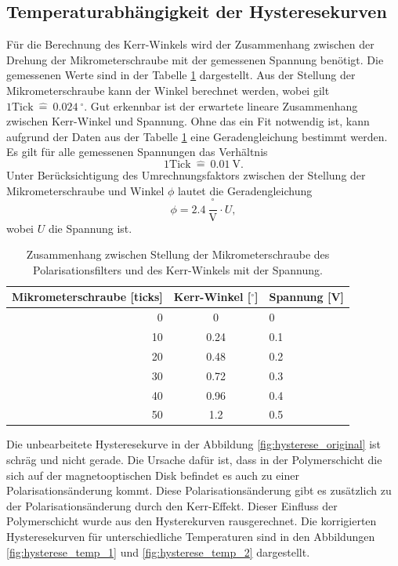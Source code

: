 \subsection{Temperaturabhängigkeit der Hysteresekurven}
Für die Berechnung des Kerr-Winkels wird der Zusammenhang zwischen der Drehung der Mikrometerschraube mit der gemessenen Spannung benötigt. Die gemessenen Werte sind in der Tabelle \ref{tab:Mikrometerschraube} dargestellt. Aus der Stellung der Mikrometerschraube kann der Winkel berechnet werden, wobei gilt $ 1 \mathrm{Tick}\ \widehat{=}\ 0.024\ {}^\circ$. Gut erkennbar ist der erwartete lineare Zusammenhang zwischen Kerr-Winkel und Spannung. Ohne das ein Fit notwendig ist, kann aufgrund der Daten aus der Tabelle \ref{tab:Mikrometerschraube} eine Geradengleichung bestimmt werden. Es gilt für alle gemessenen Spannungen das Verhältnis
\begin{equation}
1 \mathrm{Tick}\ \widehat{=}\ 0.01\ \mathrm{V}.
\end{equation}
Unter Berücksichtigung des Umrechnungsfaktors zwischen der Stellung der Mikrometerschraube und Winkel $\phi$ lautet die Geradengleichung 
\begin{equation}
\phi = 2.4\ \frac{{ }^\circ}{\mathrm{V}} \cdot U,
\label{eq:Kerr}
\end{equation}
wobei $U$ die Spannung ist. 

\begin{table}[h]
    \centering
    \caption{
        Zusammenhang zwischen Stellung der Mikrometerschraube des Polarisationsfilters und  des Kerr-Winkels mit der Spannung.
        }
    \label{tab:Mikrometerschraube}
    \begin{tabular}{r|c|l}
    Mikrometerschraube [ticks] & Kerr-Winkel [${}^\circ$]& Spannung [V] \\\hline
    0  & 0 & 0
 \\
    10 & 0.24 & 0.1
 \\
    20 & 0.48 & 0.2
 \\
    30 & 0.72 & 0.3
 \\
    40 & 0.96 & 0.4
 \\
    50 & 1.2 & 0.5 \\   
    \end{tabular}
\end{table}
Die unbearbeitete Hysteresekurve in der Abbildung \ref{fig:hysterese_original} ist schräg und nicht gerade. 
Die Ursache dafür ist, dass in der Polymerschicht die sich auf der magnetooptischen Disk befindet es auch zu einer Polarisationsänderung kommt. 
Diese Polarisationsänderung gibt es zusätzlich zu der Polarisationsänderung durch den Kerr-Effekt. 
Dieser Einfluss der Polymerschicht wurde aus den Hysterekurven rausgerechnet. 
Die korrigierten Hysteresekurven für unterschiedliche Temperaturen  sind in den Abbildungen \ref{fig:hysterese_temp_1} und \ref{fig:hysterese_temp_2} dargestellt. 



